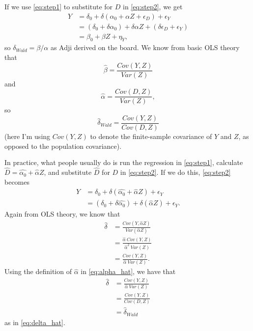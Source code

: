 \documentclass[10pt,a4paper]{article}
\begin{document}
If we use \eqref{eq:step1} to substitute for $D$ in \eqref{eq:step2}, we get
\begin{align*}
	Y &= \delta_0 + \delta \left( \alpha_0 + \alpha Z + \epsilon_D \right) + \epsilon_Y \\
	&= \left( \delta_0 + \delta \alpha_0 \right) + \delta \alpha Z + \left( \delta \epsilon_D + \epsilon_Y \right) \\
	&= \beta_0 + \beta Z + \eta_Y,
\end{align*}
so $\delta_{Wald} = \beta / \alpha$ as Adji derived on the board. We know from basic OLS theory that
\[
	\widehat{\beta} = \frac{Cov(Y, Z)}{Var(Z)}
\]
and
\begin{equation}\label{eq:alpha_hat}
	\widehat{\alpha} = \frac{Cov(D, Z)}{Var(Z)},
\end{equation}
so
\begin{equation}\label{eq:delta_hat}
	\widehat{\delta}_{Wald} = \frac{Cov(Y, Z)}{Cov(D, Z)}
\end{equation}
(here I'm using $Cov(Y, Z)$ to denote the finite-sample covariance of $Y$ and $Z$, as opposed to the population covariance).

In practice, what people usually do is run the regression in \eqref{eq:step1}, calculate $\widehat{D} = \widehat{\alpha_0} +\widehat{\alpha} Z$, and substitute $\widehat{D}$ for $D$ in \eqref{eq:step2}. If we do this, \eqref{eq:step2} becomes
\begin{align*}
	Y &= \delta_0 + \delta \left( \widehat{\alpha_0} +\widehat{\alpha} Z \right) + \epsilon_Y \\
	&= \left( \delta_0 + \delta \widehat{\alpha_0} \right) + \delta \left( \widehat{\alpha} Z \right) + \epsilon_Y.
\end{align*}
Again from OLS theory, we know that
\begin{align*}
	\widehat{\delta} &= \frac{Cov(Y, \widehat{\alpha}Z)}{Var(\widehat{\alpha}Z)} \\
	&= \frac{\widehat{\alpha} ~ Cov(Y, Z)}{\widehat{\alpha}^2 ~ Var(Z)} \\
	&= \frac{Cov(Y, Z)}{\widehat{\alpha} ~ Var(Z)}.
\end{align*}
Using the definition of $\widehat{\alpha}$ in \eqref{eq:alpha_hat}, we have that
\begin{align*}
	\widehat{\delta} &= \frac{Cov(Y, Z)}{\widehat{\alpha} ~ Var(Z)} \\
	&= \frac{Cov(Y, Z)}{Cov(D, Z)} \\
	&= \widehat{\delta}_{Wald}
\end{align*}
as in \eqref{eq:delta_hat}.
\end{document}
